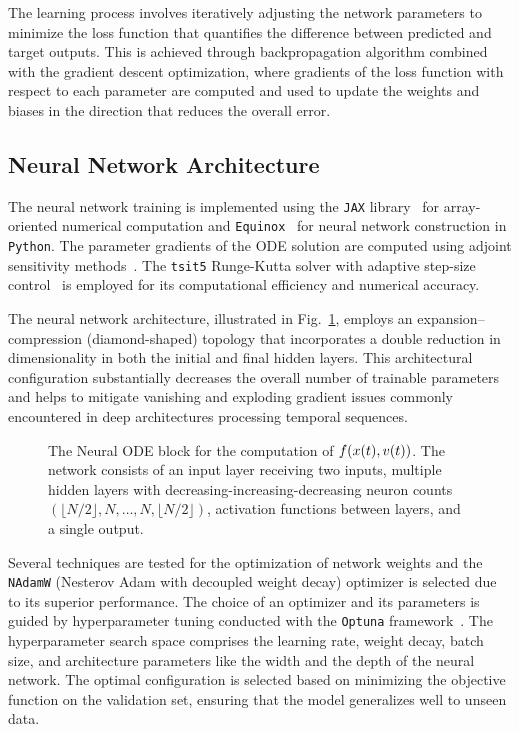 \documentclass{ieeeaccess}
\begin{document}
The learning process involves iteratively adjusting the network parameters to minimize the loss function that quantifies the difference between predicted and target outputs. This is  achieved through backpropagation algorithm combined with the gradient descent optimization, where gradients of the loss function with respect to each parameter are computed and used to update the weights and biases in the direction that reduces the overall error.

\subsection{Neural Network Architecture}
\label{sec:nn_architecture}

The neural network training is implemented using the \texttt{JAX} library~\cite{jax2018github} for array-oriented numerical computation and \texttt{Equinox}~\cite{kidger2021equinox} for neural network construction in \texttt{Python}. The parameter gradients of the ODE solution are computed using adjoint sensitivity methods~\cite{stumm2010new, Ricky2018}. The \texttt{tsit5} Runge-Kutta solver with adaptive step-size control~\cite{Tsitouras2011} is employed for its computational efficiency and numerical accuracy.


The neural network architecture, illustrated in Fig.~\ref{fig:nn-arch}, employs an expansion–compression (diamond-shaped) topology that incorporates a double reduction in dimensionality in both the initial and final hidden layers.
This architectural configuration substantially decreases the overall number of trainable parameters and helps to mitigate vanishing and exploding gradient issues commonly encountered in deep architectures processing temporal sequences.

\begin{figure}[ht!]
  \centering
  \resizebox{\columnwidth}{!}{%
    
  }
  \caption{ The Neural ODE block for the computation of \(f(x(t), v(t))\). The network consists of an input layer receiving two inputs, multiple hidden layers with decreasing-increasing-decreasing neuron counts \(\left(\lfloor N/2 \rfloor, N,\ldots,N, \lfloor N/2 \rfloor\right)\), activation functions between layers, and a single output. }

  \label{fig:nn-arch}
\end{figure}

Several techniques are tested for the optimization of network weights and the \texttt{NAdamW} (Nesterov Adam with decoupled weight decay) optimizer is selected due to its superior performance.
The choice of an optimizer and its parameters is guided by hyperparameter tuning conducted with the \texttt{Optuna} framework~\cite{Akiba2019}. The hyperparameter search space comprises the learning rate, weight decay, batch size, and architecture parameters like the width and the depth of the neural network.
The optimal configuration is selected based on minimizing the objective function on the validation set, ensuring that the model generalizes well to unseen data.
\end{document}
